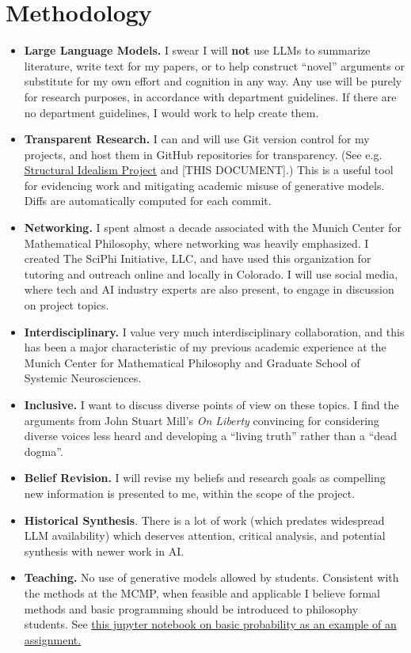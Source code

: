 \documentclass[11pt, oneside]{article}   	%
\begin{document}
\section{Methodology}

\begin{itemize}
    \item \textbf{Large Language Models.}  I swear I will \textbf{not} use LLMs to summarize literature, write text for my papers, or to help construct ``novel'' arguments or substitute for my own effort and cognition in any way. Any use will be purely for research purposes, in accordance with department guidelines.  If there are no department guidelines, I would work to help create them. 
    \item \textbf{Transparent Research.}  I can and will use Git version control for my projects, and host them in GitHub repositories for transparency.  (See e.g. \href{https://github.com/CameronBeebe/Structural_Idealism}{Structural Idealism Project} and [THIS DOCUMENT].)  This is a useful tool for evidencing work and mitigating academic misuse of generative models.  Diffs are automatically computed for each commit.
    \item \textbf{Networking.} I spent almost a decade associated with the Munich Center for Mathematical Philosophy, where networking was heavily emphasized.  I created The SciPhi Initiative, LLC, and have used this organization for tutoring and outreach online and locally in Colorado.  I will use social media, where tech and AI industry experts are also present, to engage in discussion on project topics.
    \item \textbf{Interdisciplinary.}  I value very much interdisciplinary collaboration, and this has been a major characteristic of my previous academic experience at the Munich Center for Mathematical Philosophy and Graduate School of Systemic Neurosciences.
    \item \textbf{Inclusive.}  I want to discuss diverse points of view on these topics.  I find the arguments from John Stuart Mill's \emph{On Liberty} \citep{OnLiberty1859} convincing for considering diverse voices less heard and developing a ``living truth'' rather than a ``dead dogma''.
    \item \textbf{Belief Revision.}  I will revise my beliefs and research goals as compelling new information is presented to me, within the scope of the project.
    \item \textbf{Historical Synthesis}.  There is a lot of work (which predates widespread LLM availability) which deserves attention, critical analysis, and potential synthesis with newer work in AI.
    \item \textbf{Teaching.}  No use of generative models allowed by students.  Consistent with the methods at the MCMP, when feasible and applicable I believe formal methods and basic programming should be introduced to philosophy students.  See \href{https://github.com/CameronBeebe/Probability_Intro/blob/main/Coins.ipynb}{this jupyter notebook on basic probability as an example of an assignment.}
    
\end{itemize}
\end{document}
